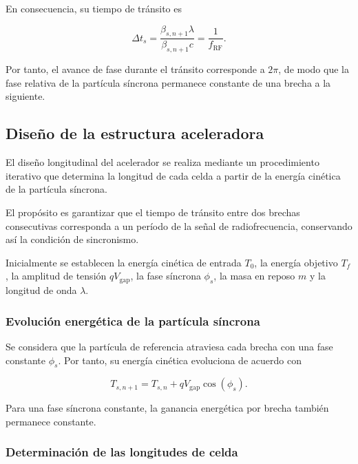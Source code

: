 En consecuencia, su tiempo de tránsito es

\begin{equation}
    \Delta t_s
    =
    \frac{\beta_{s,n+1}\lambda}
    {\beta_{s,n+1}c}
    =
    \frac{1}{f_{\mathrm{RF}}}.
\end{equation}

Por tanto, el avance de fase durante el tránsito corresponde a $2\pi$, de modo que la fase relativa de la partícula síncrona permanece constante de una brecha a la siguiente.

\subsection{Diseño de la estructura aceleradora}

El diseño longitudinal del acelerador se realiza mediante un procedimiento iterativo que determina la longitud de cada celda a partir de la energía cinética de la partícula síncrona.

El propósito es garantizar que el tiempo de tránsito entre dos brechas consecutivas corresponda a un período de la señal de radiofrecuencia, conservando así la condición de sincronismo.

Inicialmente se establecen la energía cinética de entrada $T_0$, la energía objetivo $T_f$, la amplitud de tensión $qV_{\mathrm{gap}}$, la fase síncrona $\phi_s$, la masa en reposo $m$ y la longitud de onda $\lambda$.

\subsubsection*{Evolución energética de la partícula síncrona}

Se considera que la partícula de referencia atraviesa cada brecha con una fase constante $\phi_s$. Por tanto, su energía cinética evoluciona de acuerdo con

\begin{equation}
    T_{s,n+1}
    =
    T_{s,n}
    +
    qV_{\mathrm{gap}}\cos(\phi_s).
\end{equation}

Para una fase síncrona constante, la ganancia energética por brecha también permanece constante.

\subsubsection*{Determinación de las longitudes de celda}

